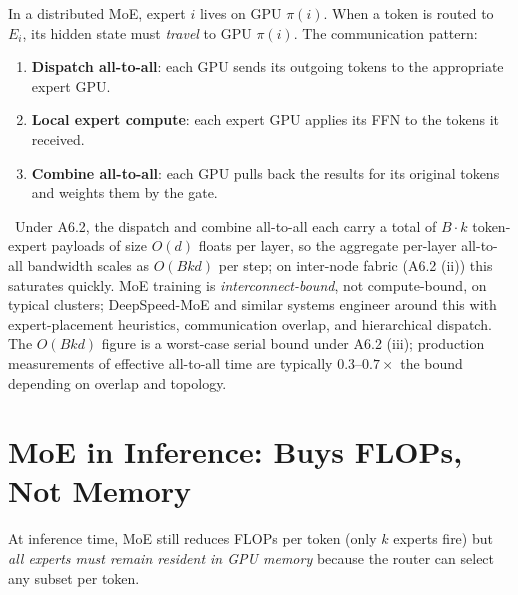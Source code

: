 In a distributed MoE, expert $i$ lives on GPU $\pi(i)$. When a token
is routed to $E_i$, its hidden state must \emph{travel} to GPU
$\pi(i)$. The communication pattern:
\begin{enumerate}
  \item \textbf{Dispatch all-to-all}: each GPU sends its outgoing
        tokens to the appropriate expert GPU.
  \item \textbf{Local expert compute}: each expert GPU applies its
        FFN to the tokens it received.
  \item \textbf{Combine all-to-all}: each GPU pulls back the results
        for its original tokens and weights them by the gate.
\end{enumerate}
\Assum\ Under A6.2, the dispatch and combine all-to-all each carry a
total of $B \cdot k$ token-expert payloads of size $O(d)$ floats per
layer, so the aggregate per-layer all-to-all bandwidth scales as
$O(B k d)$ per step; on inter-node fabric (A6.2 (ii)) this saturates
quickly. MoE training is \emph{interconnect-bound}, not
compute-bound, on typical clusters; DeepSpeed-MoE
\citep{rajbhandari2022deepspeedmoe} and similar systems engineer
around this with expert-placement heuristics, communication
overlap, and hierarchical dispatch. The $O(B k d)$ figure is a
worst-case serial bound under A6.2 (iii); production measurements of
effective all-to-all time are typically $0.3$--$0.7\times$ the bound
depending on overlap and topology.

\section{MoE in Inference: Buys FLOPs, Not Memory}

At inference time, MoE still reduces FLOPs per token (only $k$
experts fire) but \emph{all experts must remain resident in GPU
memory} because the router can select any subset per token.

